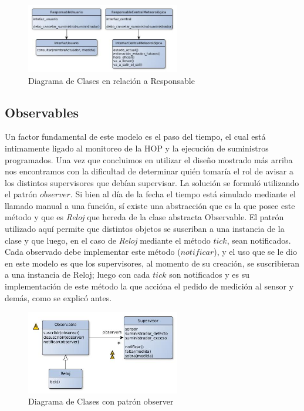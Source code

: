 \begin{figure}[h!]
  \centering
  \includegraphics[width=0.6\textwidth]{./imagenes/clases.jpg}
  \caption{Diagrama de Clases en relación a Responsable}
  \label{fig:clases_resp}
\end{figure}

\subsection{Observables}

Un factor fundamental de este modelo es el paso del tiempo, el cual está intimamente ligado al monitoreo de la HOP y la ejecución de suministros programados. Una vez que concluimos en utilizar el diseño mostrado más arriba nos encontramos con la dificultad de determinar quién tomaría el rol de avisar a los distintos supervisores que debían supervisar. La solución se formuló utilizando el patrón $observer$. Si bien al día de la fecha el tiempo está simulado mediante el llamado manual a una función, sí existe una abstracción que es la que posee este método y que es \textsl{Reloj} que hereda de la clase abstracta Observable. El patrón utilizado aquí permite que distintos objetos se suscriban a una instancia de la clase y que luego, en el caso de \textsl{Reloj} mediante el método $tick$, sean notificados. Cada observado debe implementar este método ($notificar$), y el uso que se le dio en este modelo es que los supervisores, al momento de su creación, se suscribieran a una instancia de Reloj; luego con cada $tick$ son notificados y es su implementación de este método la que accióna el pedido de medición al sensor y demás, como se explicó antes. 

\begin{figure}[h!]
  \centering
  \includegraphics[width=0.6\textwidth]{./imagenes/clases3.jpg}
  \caption{Diagrama de Clases con patrón observer}
  \label{fig:clases_obs}
\end{figure}

